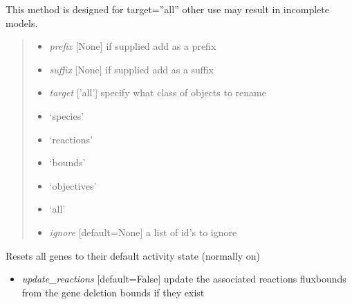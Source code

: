 \documentclass[a4paper,11pt,english]{sphinxmanual}
\begin{document}
\begin{fulllineitems}
\begin{fulllineitems}
\begin{itemize}
\end{itemize}

\end{fulllineitems}


\begin{fulllineitems}
\label{modules_doc:cbmpy.CBModel.Model.renameObjectIds}
This method is designed for target=''all'' other use may result in incomplete models.
\begin{quote}
\begin{itemize}
\item {} 
\emph{prefix} {[}None{]} if supplied add as a prefix

\item {} 
\emph{suffix} {[}None{]} if supplied add as a suffix

\item {} 
\emph{target} {[}'all'{]} specify what class of objects to rename

\end{itemize}
\begin{itemize}
\item {} 
`species'

\item {} 
`reactions'

\item {} 
`bounds'

\item {} 
`objectives'

\item {} 
`all'

\end{itemize}
\begin{itemize}
\item {} 
\emph{ignore} {[}default=None{]} a list of id's to ignore

\end{itemize}
\end{quote}

\end{fulllineitems}


\begin{fulllineitems}
\label{modules_doc:cbmpy.CBModel.Model.resetAllGenes}
Resets all genes to their default activity state (normally on)
\begin{itemize}
\item {} 
\emph{update\_reactions} {[}default=False{]} update the associated reactions fluxbounds from the gene deletion bounds if they exist


\end{itemize}
\end{fulllineitems}
\end{fulllineitems}
\end{document}
